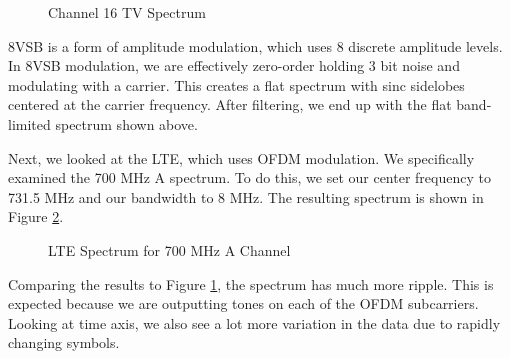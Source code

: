 \documentclass{article}
\begin{document}
\begin{figure}[H]
	\centerline{}
	\caption{Channel 16 TV Spectrum}
	\label{fig::8vsb_spectrum}
\end{figure}


8VSB is a form of amplitude modulation, which uses 8 discrete amplitude levels. In 8VSB modulation, we are effectively zero-order holding 3 bit noise and modulating with a carrier. This creates a flat spectrum with sinc sidelobes centered at the carrier frequency. After filtering, we end up with the flat band-limited spectrum shown above.
 
Next, we looked at the LTE, which uses OFDM modulation. We specifically examined the 700 MHz A spectrum. To do this, we set our center frequency to 731.5 MHz and our bandwidth to 8 MHz. The resulting spectrum is shown in Figure \ref{fig::lte_spectrum}.

\begin{figure}[H]
	\centerline{}
	\caption{LTE Spectrum for 700 MHz A Channel}
	\label{fig::lte_spectrum}
\end{figure}

Comparing the results to Figure \ref{fig::8vsb_spectrum}, the spectrum has much more ripple. This is expected because we are outputting tones on each of the OFDM subcarriers. Looking at time axis, we also see a lot more variation in the data due to rapidly changing symbols.
\end{document}
